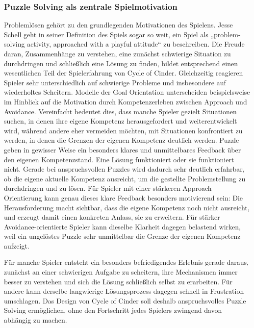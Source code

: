 \subsubsection{Puzzle Solving als zentrale Spielmotivation}
Problemlösen gehört zu den grundlegenden Motivationen des Spielens. Jesse Schell geht in seiner Definition des Spiels sogar so weit, ein Spiel als „problem-solving activity, approached with a playful attitude“ zu beschreiben. Die Freude daran, Zusammenhänge zu verstehen, eine zunächst schwierige Situation zu durchdringen und schließlich eine Lösung zu finden, bildet entsprechend einen wesentlichen Teil der Spielerfahrung von Cycle of Cinder.
Gleichzeitig reagieren Spieler sehr unterschiedlich auf schwierige Probleme und insbesondere auf wiederholtes Scheitern. Modelle der Goal Orientation unterscheiden beispielsweise im Hinblick auf die Motivation durch Kompetenzerleben zwischen Approach und Avoidance. Vereinfacht bedeutet dies, dass manche Spieler gezielt Situationen suchen, in denen ihre eigene Kompetenz herausgefordert und weiterentwickelt wird, während andere eher vermeiden möchten, mit Situationen konfrontiert zu werden, in denen die Grenzen der eigenen Kompetenz deutlich werden.
Puzzle geben in gewisser Weise ein besonders klares und unmittelbares Feedback über den eigenen Kompetenzstand. Eine Lösung funktioniert oder sie funktioniert nicht. Gerade bei anspruchsvollen Puzzles wird dadurch sehr deutlich erfahrbar, ob die eigene aktuelle Kompetenz ausreicht, um die gestellte Problemstellung zu durchdringen und zu lösen.
Für Spieler mit einer stärkeren Approach-Orientierung kann genau dieses klare Feedback besonders motivierend sein: Die Herausforderung macht sichtbar, dass die eigene Kompetenz noch nicht ausreicht, und erzeugt damit einen konkreten Anlass, sie zu erweitern. Für stärker Avoidance-orientierte Spieler kann dieselbe Klarheit dagegen belastend wirken, weil ein ungelöstes Puzzle sehr unmittelbar die Grenze der eigenen Kompetenz aufzeigt.


Für manche Spieler entsteht ein besonders befriedigendes Erlebnis gerade daraus, zunächst an einer schwierigen Aufgabe zu scheitern, ihre Mechanismen immer besser zu verstehen und sich die Lösung schließlich selbst zu erarbeiten. Für andere kann derselbe langwierige Lösungsprozess dagegen schnell in Frustration umschlagen. Das Design von Cycle of Cinder soll deshalb anspruchsvolles Puzzle Solving ermöglichen, ohne den Fortschritt jedes Spielers zwingend davon abhängig zu machen.

